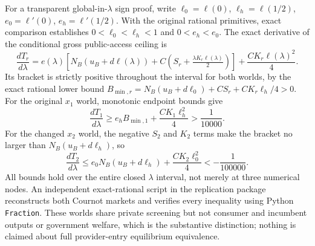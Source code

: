 For a transparent global-in-$\lambda$ sign proof, write
$\ell_0=\ell(0)$,
$\ell_h=\ell(1/2)$,
$e_0=\ell'(0)$,
$e_h=\ell'(1/2)$.
With the original rational primitives, exact comparison establishes
$0<\ell_0<\ell_h<1$ and $0<e_h<e_0$.
The exact derivative of the conditional gross public-access ceiling
is
\[
 \frac{dT_r}{d\lambda}
 = e(\lambda)
    \left[
      N_B(u_B+d\ell(\lambda))
      +C\left(S_r+\tfrac{\lambda K_r\ell(\lambda)}{2}\right)
    \right]
      +\frac{C K_r\ell(\lambda)^2}{4}.
\]
Its bracket is strictly positive throughout the interval for both
worlds, by the exact rational lower bound
$B_{\min,r}=
 N_B(u_B+d\ell_0)+C S_r+C K_r\ell_h/4>0$.
For the original $x_1$ world, monotonic endpoint bounds give
\[
 \frac{dT_1}{d\lambda}\geq
 e_h B_{\min,1}+\frac{C K_1\ell_h^2}{4}
 >\frac{1}{10000}.
\]
For the changed $x_2$ world, the negative $S_2$ and $K_2$ terms
make the bracket no larger than $N_B(u_B+d\ell_h)$, so
\[
 \frac{dT_2}{d\lambda}\leq
 e_0N_B(u_B+d\ell_h)+\frac{C K_2\ell_0^2}{4}
 <-\frac{1}{100000}.
\]
All bounds hold over the entire closed $\lambda$ interval, not merely
at three numerical nodes. An independent exact-rational script in the replication package
reconstructs both Cournot markets and verifies every inequality
using Python \texttt{Fraction}. These worlds share private screening but not
consumer and incumbent outputs or government welfare, which is the
substantive distinction; nothing is claimed about full provider-entry
equilibrium equivalence.

